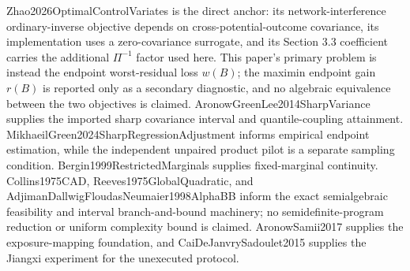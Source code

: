 Zhao2026OptimalControlVariates is the direct anchor: its network-interference ordinary-inverse objective depends on cross-potential-outcome covariance, its implementation uses a zero-covariance surrogate, and its Section 3.3 coefficient carries the additional \(\Pi^{-1}\) factor used here.  This paper's primary problem is instead the endpoint worst-residual loss \(w(B)\); the maximin endpoint gain \(r(B)\) is reported only as a secondary diagnostic, and no algebraic equivalence between the two objectives is claimed.  AronowGreenLee2014SharpVariance supplies the imported sharp covariance interval and quantile-coupling attainment.  MikhaeilGreen2024SharpRegressionAdjustment informs empirical endpoint estimation, while the independent unpaired product pilot is a separate sampling condition.  Bergin1999RestrictedMarginals supplies fixed-marginal continuity.  Collins1975CAD, Reeves1975GlobalQuadratic, and AdjimanDallwigFloudasNeumaier1998AlphaBB inform the exact semialgebraic feasibility and interval branch-and-bound machinery; no semidefinite-program reduction or uniform complexity bound is claimed.  AronowSamii2017 supplies the exposure-mapping foundation, and CaiDeJanvrySadoulet2015 supplies the Jiangxi experiment for the unexecuted protocol.